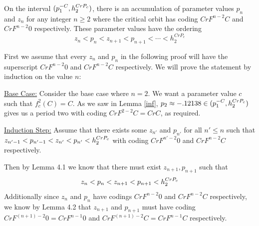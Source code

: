 		\begin{myprop} \label{homaccum}
			On the interval $ (p^{-C}_1, h^{CrP_c}_2)$, there is an accumulation of parameter values $p_n$ and $z_n$ for any integer $n \geq 2$ where the critical orbit has coding $CrF^{n-2}C$ and $CrF^{n-2}0$ respectively. These parameter values have the ordering
			\[
			z_n < p_n < z_{n+1} < p_{n+1} < \cdots < h_2^{CrP_c}
			\]
		\end{myprop}

		\begin{myproof}
			First we assume that every $z_n$ and $p_n$ in the following proof will have the superscript $CrF^{n-2}0$ and $CrF^{n-2}C$ respectively. We will prove the statement by induction on the value $n$:

			\underline{Base Case:} Consider the base case where $n = 2$. We want a parameter value $c$ such that $f^2_c (C) = C$. As we saw in Lemma \ref{inf}, $p_2 \approx -.12138 \in (p^{-C}_1, h^{CrP_c}_2)$ gives us a period two with coding $CrF^{2-2}C = CrC$, as required.


			\underline{Induction Step:} Assume that there exists some $z_{n'}$ and $p_{n'}$ for all $n' \leq n$ such that $z_{n'-1} < p_{n'-1} < z_{n'} < p_{n'} < h^{CrP_c}_2$ with coding $CrF^{n'-2}0$ and $CrF^{n-2}C$ respectively. 

			Then by Lemma 4.1 we know that there must exist $z_{n+1},p_{n+1}$ such that
			\[z_n < p_n < z_{n+1} < p_{n+1} < h^{CrP_c}_2\]
			Additionally since $z_n$ and $p_n$ have codings $CrF^{n-2}0$ and $CrF^{n-2}C$ respectively, we know by Lemma 4.2 that $z_{n+1}$ and $p_{n+1}$ must have coding $CrF^{ (n+1)-2}0 = CrF^{n-1}0$ and $CrF^{ (n+1)-2}C = CrF^{n-1}C$ respectively.


\end{myproof}
